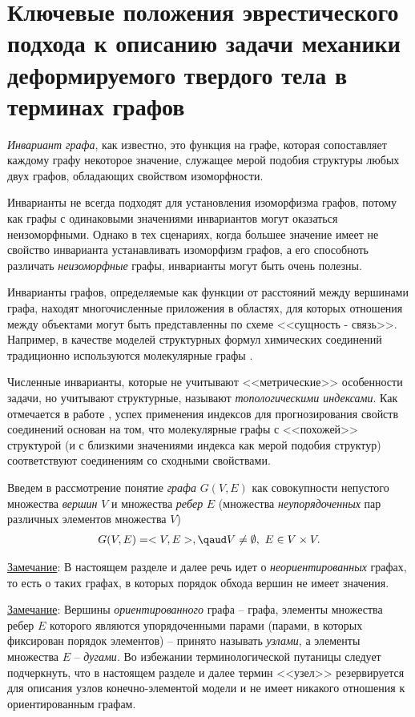 \chapter{Ключевые положения эврестического подхода к описанию задачи механики деформируемого твердого тела в терминах графов}\label{ch:ch2}

\emph{Инвариант графа}, как известно, это функция на графе, которая сопоставляет каждому графу некоторое значение, служащее мерой подобия структуры любых двух графов, обладающих свойством изоморфности.

Инварианты не всегда подходят для установления изоморфизма графов, потому как графы с одинаковыми значениями инвариантов могут оказаться неизоморфными. Однако в тех сценариях, когда большее значение имеет не свойство инварианта устанавливать изоморфизм графов, а его способноть различать \emph{неизоморфные} графы, инварианты могут быть очень полезны.

Инварианты графов, определяемые как функции от расстояний между вершинами графа, находят многочисленные приложения в областях, для которых отношения между объектами могут быть представленны по схеме <<сущность - связь>>. Например,  в качестве моделей структурных формул химических соединений традиционно используются молекулярные графы \cite{Stankevich-graph-struc-chem:1988, Gutman:1986}.

{\color{red}Численные инварианты, которые не учитывают <<метрические>> особенности задачи, но учитывают структурные, называют \emph{топологическими индексами}. Как отмечается в работе \cite{Dobrinin-viner:1998}, успех применения индексов для прогнозирования свойств соединений основан на том, что молекулярные графы с <<похожей>> структурой (и с близкими значениями индекса как мерой подобия структур) соответствуют соединениям со сходными свойствами.}

Введем в рассмотрение понятие \emph{графа} $ G(V, E) $ как совокупности непустого множества \emph{вершин} $ V $ и множества \emph{ребер} $ E $ (множества \emph{неупорядоченных} пар различных элементов множества $ V $)
\begin{align*}
	G(V, E) = <V, E>, \qaud V \neq \emptyset, \ E \in V \times V.
\end{align*}

\underline{Замечание}: В настоящем разделе и далее речь идет о \emph{неориентированных} графах, то есть о таких графах, в которых порядок обхода вершин не имеет значения.

\underline{Замечание}: Вершины \emph{ориентированного} графа -- графа, элементы множества ребер $ E $ которого являются упорядоченными парами (парами, в которых фиксирован порядок элементов) -- принято называть \emph{узлами}, а элементы множества $ E $ -- \emph{дугами}. Во избежании терминологической путаницы следует подчеркнуть, что в настоящем разделе и далее термин <<узел>> резервируется для описания узлов конечно-элементой модели и не имеет никакого отношения к ориентированным графам.

